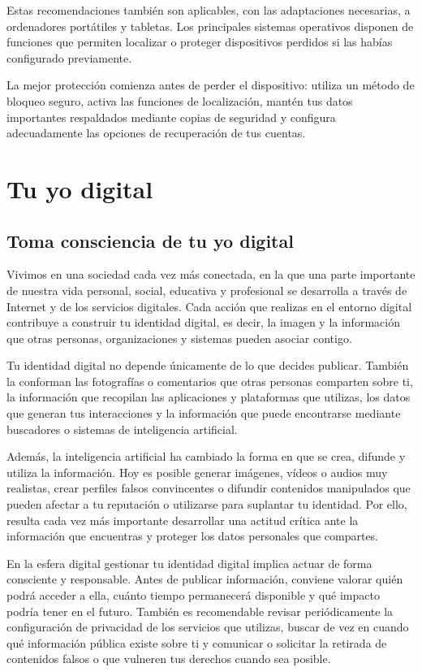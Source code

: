 \documentclass[
  spanish,
  a4paper,
  openany]{book}
\begin{document}
Estas recomendaciones también son aplicables, con las adaptaciones necesarias, a ordenadores portátiles y tabletas. Los principales sistemas operativos disponen de funciones que permiten localizar o proteger dispositivos perdidos si las habías configurado previamente.

La mejor protección comienza antes de perder el dispositivo: utiliza un método de bloqueo seguro, activa las funciones de localización, mantén tus datos importantes respaldados mediante copias de seguridad y configura adecuadamente las opciones de recuperación de tus cuentas.

\chapter{Tu yo digital}\label{tu-yo-digital}

\section{Toma consciencia de tu yo digital}\label{toma-consciencia-de-tu-yo-digital}

Vivimos en una sociedad cada vez más conectada, en la que una parte importante de nuestra vida personal, social, educativa y profesional se desarrolla a través de Internet y de los servicios digitales. Cada acción que realizas en el entorno digital contribuye a construir tu identidad digital, es decir, la imagen y la información que otras personas, organizaciones y sistemas pueden asociar contigo.

Tu identidad digital no depende únicamente de lo que decides publicar. También la conforman las fotografías o comentarios que otras personas comparten sobre ti, la información que recopilan las aplicaciones y plataformas que utilizas, los datos que generan tus interacciones y la información que puede encontrarse mediante buscadores o sistemas de inteligencia artificial.

Además, la inteligencia artificial ha cambiado la forma en que se crea, difunde y utiliza la información. Hoy es posible generar imágenes, vídeos o audios muy realistas, crear perfiles falsos convincentes o difundir contenidos manipulados que pueden afectar a tu reputación o utilizarse para suplantar tu identidad. Por ello, resulta cada vez más importante desarrollar una actitud crítica ante la información que encuentras y proteger los datos personales que compartes.

En la esfera digital gestionar tu identidad digital implica actuar de forma consciente y responsable. Antes de publicar información, conviene valorar quién podrá acceder a ella, cuánto tiempo permanecerá disponible y qué impacto podría tener en el futuro. También es recomendable revisar periódicamente la configuración de privacidad de los servicios que utilizas, buscar de vez en cuando qué información pública existe sobre ti y comunicar o solicitar la retirada de contenidos falsos o que vulneren tus derechos cuando sea posible.
\end{document}
